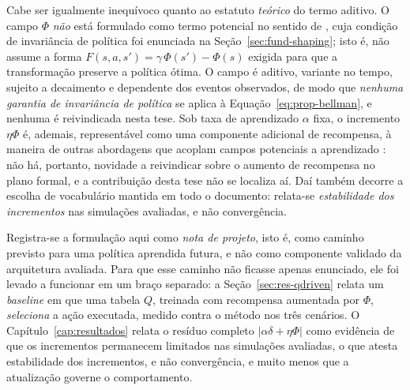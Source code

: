 Cabe ser igualmente inequívoco quanto ao estatuto \emph{teórico} do termo aditivo. O
campo $\Phi$ \emph{não} está formulado como termo potencial no sentido de
, cuja condição de invariância de política foi enunciada na
Seção~\ref{sec:fund-shaping}; isto é, não assume a forma
$F(s,a,s')=\gamma\,\Phi(s')-\Phi(s)$ exigida para que a transformação preserve a
política ótima. O campo é aditivo, variante no tempo, sujeito a decaimento e
dependente dos eventos observados, de modo que \emph{nenhuma garantia de invariância
de política} se aplica à Equação~\eqref{eq:prop-bellman}, e nenhuma é reivindicada
nesta tese. Sob taxa de aprendizado $\alpha$ fixa, o incremento $\eta\Phi$ é,
ademais, representável como uma componente adicional de recompensa, à maneira de
outras abordagens que acoplam campos potenciais a aprendizado
\cite{zhang2023apf}: não há, portanto, novidade a reivindicar sobre o aumento de
recompensa no plano formal, e a contribuição desta tese não se localiza aí. Daí
também decorre a escolha de vocabulário mantida em todo o documento: relata-se
\emph{estabilidade dos incrementos} nas simulações avaliadas, e não convergência.

Registra-se a formulação aqui como \emph{nota de projeto}, isto é, como caminho
previsto para uma política aprendida futura, e não como componente validado da
arquitetura avaliada. Para que esse caminho não ficasse apenas enunciado, ele foi
levado a funcionar em um braço separado: a Seção~\ref{sec:res-qdriven} relata um
\textit{baseline} em que uma tabela $Q$, treinada com recompensa aumentada por
$\Phi$, \emph{seleciona} a ação executada, medido contra o método nos três
cenários. O Capítulo~\ref{cap:resultados} relata o resíduo completo
$|\alpha\delta+\eta\Phi|$ como evidência de que os incrementos permanecem limitados
nas simulações avaliadas, o que atesta estabilidade dos incrementos, e não
convergência, e muito menos que a atualização governe o comportamento.
